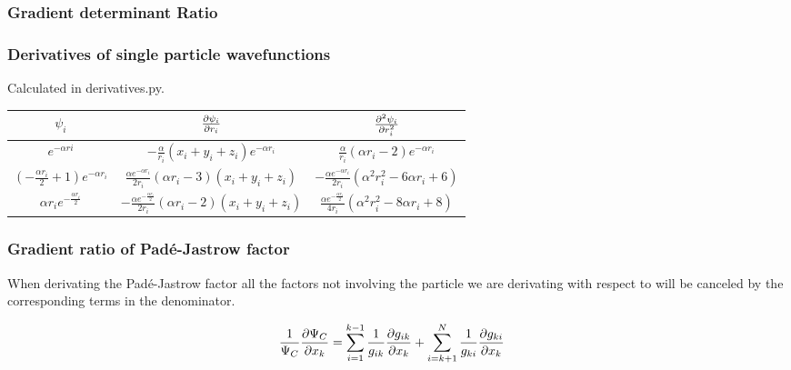\documentclass[11pt]{article}
\begin{document}
	\subsubsection{Gradient determinant Ratio}


	\subsubsection{Derivatives of single particle wavefunctions}
		Calculated in  derivatives.py.

		\begin{center}
			\begin{tabular}{| c | c | c |}
			\bottomrule
			\( \psi_i\)	& \( \pdv{\psi_i}{r_i} \) & \( \pdv[2]{\psi_i}{r_i} \)
			\\ \hline
			\( e^{- \alpha ri} \) &  \( - \frac{\alpha}{r_{i}} \left(x_{i} + y_{i} + z_{i}\right) e^{- \alpha r_{i}} \)	&	\(\frac{\alpha}{r_{i}} \left(\alpha r_{i} - 2\right) e^{- \alpha r_{i}} \)
			\\	\hline
			\( \left(- \frac{\alpha r_{i}}{2} + 1\right) e^{- \alpha r_{i}} \) &  \( \frac{\alpha e^{- \alpha r_{i}}}{2 r_{i}} \left(\alpha r_{i} - 3\right) \left(x_{i} + y_{i} + z_{i}\right) \)	&	\( - \frac{\alpha e^{- \alpha r_{i}}}{2 r_{i}} \left(\alpha^{2} r_{i}^{2} - 6 \alpha r_{i} + 6\right) \)
			\\	\hline
			\( \alpha r_{i} e^{- \frac{\alpha r_{i}}{2}} \) &  \( - \frac{\alpha e^{- \frac{\alpha r_{i}}{2}}}{2 r_{i}} \left(\alpha r_{i} - 2\right) \left(x_{i} + y_{i} + z_{i}\right) \) & \( \frac{\alpha e^{- \frac{\alpha r_{i}}{2}}}{4 r_{i}} \left(\alpha^{2} r_{i}^{2} - 8 \alpha r_{i} + 8\right) \)
			\\ \toprule
			\end{tabular}
		\end{center}

	\subsubsection{ Gradient ratio of  Padé-Jastrow factor }

		When derivating the Padé-Jastrow factor all the factors not involving the particle we are derivating with respect to will be canceled by the corresponding terms in the denominator.

		\begin{align}
			\frac{1}{\Psi_C}\pdv{\Psi_C}{x_k} &= \sum_{i=1}^{k-1}\frac{1}{g_{ik}}\pdv{g_{ik}}{x_k} +  \sum_{i=k+1}^{N}\frac{1}{g_{ki}}\pdv{g_{ki}}{x_k}
		\end{align}
\end{document}
